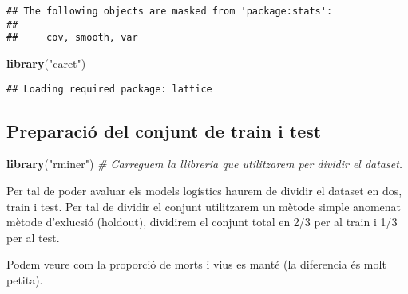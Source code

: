 \documentclass[]{article}
\newenvironment{Shaded}{\begin{snugshade}}{\end{snugshade}}
\newcommand{\CommentTok}[1]{\textcolor[rgb]{0.56,0.35,0.01}{\textit{#1}}}
\newcommand{\DataTypeTok}[1]{\textcolor[rgb]{0.13,0.29,0.53}{#1}}
\newcommand{\DecValTok}[1]{\textcolor[rgb]{0.00,0.00,0.81}{#1}}
\newcommand{\KeywordTok}[1]{\textcolor[rgb]{0.13,0.29,0.53}{\textbf{#1}}}
\newcommand{\NormalTok}[1]{#1}
\newcommand{\OperatorTok}[1]{\textcolor[rgb]{0.81,0.36,0.00}{\textbf{#1}}}
\newcommand{\StringTok}[1]{\textcolor[rgb]{0.31,0.60,0.02}{#1}}
\begin{document}
\begin{verbatim}
## The following objects are masked from 'package:stats':
## 
##     cov, smooth, var
\end{verbatim}

\begin{Shaded}
\begin{Highlighting}[]
\KeywordTok{library}\NormalTok{(}\StringTok{"caret"}\NormalTok{)}
\end{Highlighting}
\end{Shaded}

\begin{verbatim}
## Loading required package: lattice
\end{verbatim}

\hypertarget{preparaciuxf3-del-conjunt-de-train-i-test}{%
\subsection{Preparació del conjunt de train i
test}\label{preparaciuxf3-del-conjunt-de-train-i-test}}

\begin{Shaded}
\begin{Highlighting}[]
\KeywordTok{library}\NormalTok{(}\StringTok{"rminer"}\NormalTok{) }\CommentTok{# Carreguem la llibreria que utilitzarem per dividir el dataset.}
\end{Highlighting}
\end{Shaded}

Per tal de poder avaluar els models logístics haurem de dividir el
dataset en dos, train i test. Per tal de dividir el conjunt utilitzarem
un mètode simple anomenat mètode d'exlucsió (holdout), dividirem el
conjunt total en 2/3 per al train i 1/3 per al test.

\begin{Shaded}
\end{Shaded}

Podem veure com la proporció de morts i vius es manté (la diferencia és
molt petita).
\end{document}
